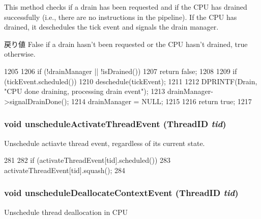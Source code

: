 This method checks if a drain has been requested and if the CPU has drained successfully (i.e., there are no instructions in the pipeline). If the CPU has drained, it deschedules the tick event and signals the drain manager.

\begin{DoxyReturn}{戻り値}
False if a drain hasn't been requested or the CPU hasn't drained, true otherwise. 
\end{DoxyReturn}



\begin{DoxyCode}
1205 {
1206     if (!drainManager || !isDrained())
1207         return false;
1208 
1209     if (tickEvent.scheduled())
1210         deschedule(tickEvent);
1211 
1212     DPRINTF(Drain, "CPU done draining, processing drain event\n");
1213     drainManager->signalDrainDone();
1214     drainManager = NULL;
1215 
1216     return true;
1217 }
\end{DoxyCode}
\hypertarget{classFullO3CPU_ae0bacbe9552a4b3a03f2748d2d58b3a2}{
\subsubsection[{unscheduleActivateThreadEvent}]{\setlength{\rightskip}{0pt plus 5cm}void unscheduleActivateThreadEvent ({\bf ThreadID} {\em tid})}}
\label{classFullO3CPU_ae0bacbe9552a4b3a03f2748d2d58b3a2}
Unschedule actiavte thread event, regardless of its current state. 


\begin{DoxyCode}
281     {
282         if (activateThreadEvent[tid].scheduled())
283             activateThreadEvent[tid].squash();
284     }
\end{DoxyCode}
\hypertarget{classFullO3CPU_adce69706fd17d1dca824e60ab0100e8b}{
\subsubsection[{unscheduleDeallocateContextEvent}]{\setlength{\rightskip}{0pt plus 5cm}void unscheduleDeallocateContextEvent ({\bf ThreadID} {\em tid})}}
\label{classFullO3CPU_adce69706fd17d1dca824e60ab0100e8b}
Unschedule thread deallocation in CPU 


